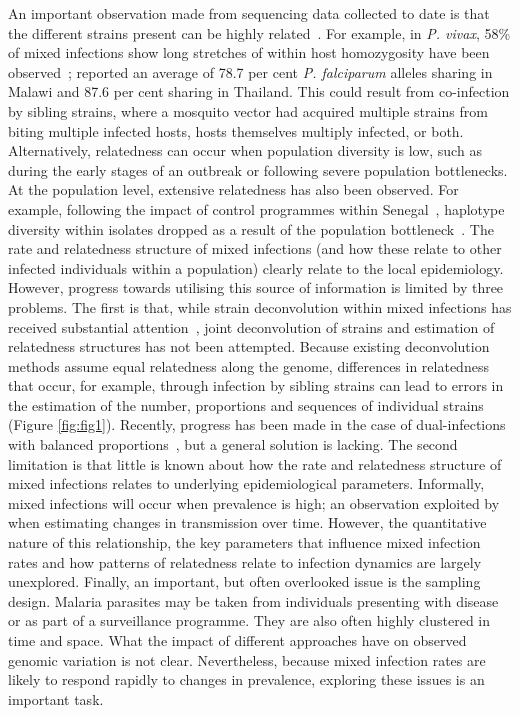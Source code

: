 \documentclass[9pt,lineno]{elife}
\begin{document}
An important observation made from sequencing data collected to date is that the different strains present can be highly related~\citep{Nair2014, Trevino2017}.  For example, in {\it P. vivax}, 58\% of mixed infections show long stretches of within host homozygosity have been observed~\citep{Pearson2016}; \citet{Nkhoma2012} reported an average of 78.7 per cent {\it P. falciparum} alleles sharing in Malawi and 87.6 per cent sharing in Thailand. This could result from co-infection by sibling strains, where a mosquito vector had acquired multiple strains from biting multiple infected hosts, hosts themselves multiply infected, or both.  Alternatively, relatedness can occur when population diversity is low, such as during the early stages of an outbreak or following severe population bottlenecks.  At the population level, extensive relatedness has also been observed.  For example, following the impact of control programmes within Senegal~\citep{Mouzin2010}, haplotype diversity within isolates dropped as a result of the population bottleneck~\citep{Wong2017}.
The rate and relatedness structure of mixed infections (and how these relate to other infected individuals within a population) clearly relate to the local epidemiology.  However, progress towards utilising this source of information is limited by three problems.  The first is that, while strain deconvolution within mixed infections has received substantial attention~\citep{Galinsky2015, Jack2016, Chang2017}, joint deconvolution of strains and estimation of relatedness structures has not been attempted.  Because existing deconvolution methods assume equal relatedness along the genome, differences in relatedness that occur, for example, through infection by sibling strains can lead to errors in the estimation of the number, proportions and sequences of individual strains (Figure \ref{fig:fig1}).  Recently, progress has been made in the case of dual-infections with balanced proportions~\citep{Henden2016}, but a general solution is lacking.  The second limitation is that little is known about how the rate and relatedness structure of mixed infections relates to underlying epidemiological parameters.  Informally, mixed infections will occur when prevalence is high; an observation exploited by \citet{Cerqueira2017} when estimating changes in transmission over time.  However, the quantitative nature of this relationship, the key parameters that influence mixed infection rates and how patterns of relatedness relate to infection dynamics are largely unexplored.  Finally, an important, but often overlooked issue is the sampling design.  Malaria parasites may be taken from individuals presenting with disease or as part of a surveillance programme.  They are also often highly clustered in time and space.  What the impact of different approaches have on observed genomic variation is not clear.  Nevertheless, because mixed infection rates are likely to respond rapidly to changes in prevalence, exploring these issues is an important task.
\end{document}
